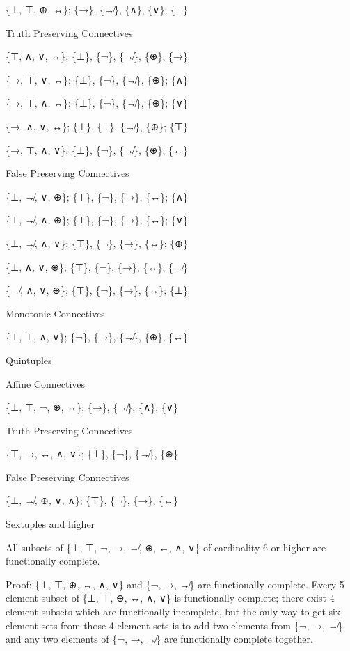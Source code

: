 \{⊥, ⊤, ⊕, ↔\}; \{→\}, \{↛\}, \{∧\}, \{∨\}; \{¬\}

\protect\hypertarget{anchor-22}{}{}Truth Preserving Connectives

\{⊤, ∧, ∨, ↔\}; \{⊥\}, \{¬\}, \{↛\}, \{⊕\}; \{→\}

\{→, ⊤, ∨, ↔\}; \{⊥\}, \{¬\}, \{↛\}, \{⊕\}; \{∧\}

\{→, ⊤, ∧, ↔\}; \{⊥\}, \{¬\}, \{↛\}, \{⊕\}; \{∨\}

\{→, ∧, ∨, ↔\}; \{⊥\}, \{¬\}, \{↛\}, \{⊕\}; \{⊤\}

\{→, ⊤, ∧, ∨\}; \{⊥\}, \{¬\}, \{↛\}, \{⊕\}; \{↔\}

\protect\hypertarget{anchor-23}{}{}False Preserving Connectives

\{⊥, ↛, ∨, ⊕\}; \{⊤\}, \{¬\}, \{→\}, \{↔\}; \{∧\}

\{⊥, ↛, ∧, ⊕\}; \{⊤\}, \{¬\}, \{→\}, \{↔\}; \{∨\}

\{⊥, ↛, ∧, ∨\}; \{⊤\}, \{¬\}, \{→\}, \{↔\}; \{⊕\}

\{⊥, ∧, ∨, ⊕\}; \{⊤\}, \{¬\}, \{→\}, \{↔\}; \{↛\}

\{↛, ∧, ∨, ⊕\}; \{⊤\}, \{¬\}, \{→\}, \{↔\}; \{⊥\}

\protect\hypertarget{anchor-24}{}{}Monotonic Connectives

\{⊥, ⊤, ∧, ∨\}; \{¬\}, \{→\}, \{↛\}, \{⊕\}, \{↔\}

\protect\hypertarget{anchor-25}{}{}Quintuples

\protect\hypertarget{anchor-26}{}{}Affine Connectives

\{⊥, ⊤, ¬, ⊕, ↔\}; \{→\}, \{↛\}, \{∧\}, \{∨\}

\protect\hypertarget{anchor-27}{}{}Truth Preserving Connectives

\{⊤, →, ↔, ∧, ∨\}; \{⊥\}, \{¬\}, \{↛\}, \{⊕\}

\protect\hypertarget{anchor-28}{}{}False Preserving Connectives

\{⊥, ↛, ⊕, ∨, ∧\}; \{⊤\}, \{¬\}, \{→\}, \{↔\}

\protect\hypertarget{anchor-29}{}{}Sextuples and higher

All subsets of \{⊥, ⊤, ¬, →, ↛, ⊕, ↔, ∧, ∨\} of cardinality 6 or higher
are functionally complete.

Proof: \{⊥, ⊤, ⊕, ↔, ∧, ∨\} and \{¬, →, ↛\} are functionally complete.
Every 5 element subset of \{⊥, ⊤, ⊕, ↔, ∧, ∨\} is functionally complete;
there exist 4 element subsets which are functionally incomplete, but the
only way to get six element sets from those 4 element sets is to add two
elements from \{¬, →, ↛\} and any two elements of \{¬, →, ↛\} are
functionally complete together.

